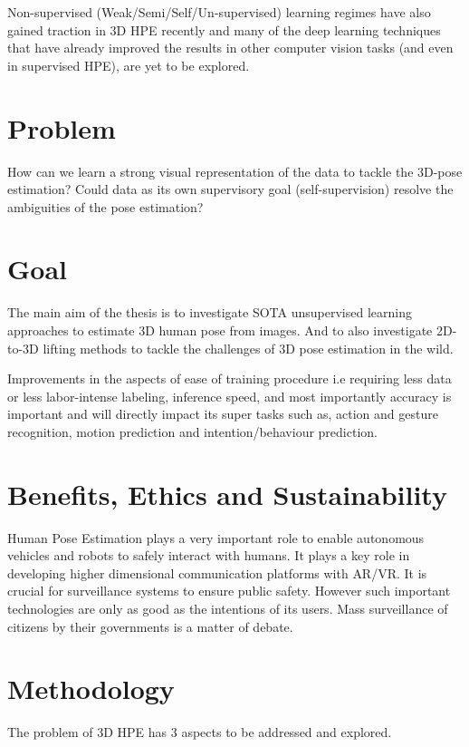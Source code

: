 Non-supervised (Weak/Semi/Self/Un-supervised) learning regimes have also gained traction in 3D HPE recently and many of the deep learning techniques that have already improved the results in other computer vision tasks (and even in supervised \ac{HPE}), are yet to be explored. 

\section{Problem}
How can we learn a strong visual representation of the data to tackle the 3D-pose estimation? Could data as its own supervisory goal (self-supervision) resolve the ambiguities of the pose estimation?


\section{Goal}

The main aim of the thesis is to investigate \ac{SOTA} unsupervised learning approaches to estimate 3D human pose from images. And to also investigate 2D-to-3D lifting methods to tackle the challenges of 3D pose estimation in the wild. 

Improvements in the aspects of ease of training procedure i.e requiring less data or less labor-intense labeling, inference speed, and most importantly accuracy is important and will directly impact its super tasks such as, action and gesture recognition, motion prediction and intention/behaviour prediction.

\section{Benefits, Ethics and Sustainability}
Human Pose Estimation plays a very important role to enable autonomous vehicles and robots to safely interact with humans. It plays a key role in developing higher dimensional communication platforms with \ac{AR/VR}. It is crucial for surveillance systems to ensure public safety. However such important technologies are only as good as the intentions of its users. Mass surveillance of citizens by their governments is a matter of debate.  

\section{Methodology}

The problem of 3D \ac{HPE} has 3 aspects to be addressed and explored. 

